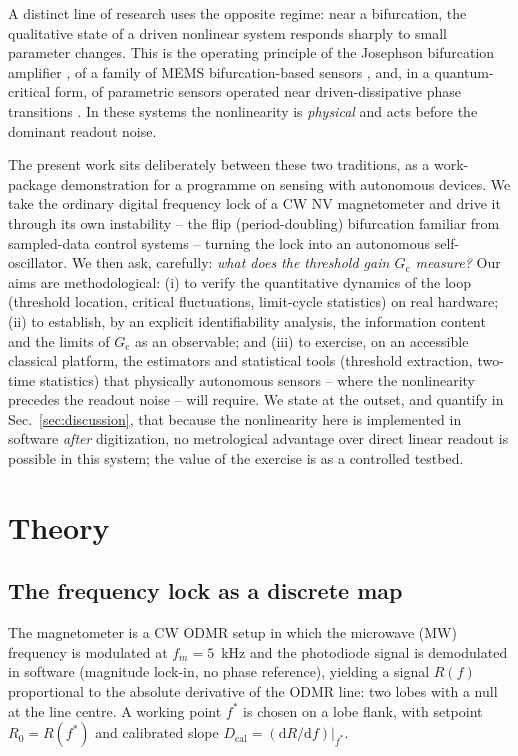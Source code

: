 \documentclass[11pt,a4paper]{article}
\newcommand{\Gc}{G_{\mathrm{c}}}
\newcommand{\Dcal}{D_{\mathrm{cal}}}
\begin{document}
A distinct line of research uses the opposite regime: near a bifurcation, the
qualitative state of a driven nonlinear system responds sharply to small
parameter changes. This is the operating principle of the Josephson
bifurcation amplifier \cite{Siddiqi2004}, of a family of MEMS
bifurcation-based sensors \cite{MEMSunlock2023,MEMSmass2020}, and, in a
quantum-critical form, of parametric sensors operated near driven-dissipative
phase transitions \cite{DiCandia2023,PRXQ2025}. In these systems the
nonlinearity is \emph{physical} and acts before the dominant readout noise.

The present work sits deliberately between these two traditions, as a
work-package demonstration for a programme on sensing with autonomous devices.
We take the ordinary digital frequency lock of a CW NV magnetometer and drive
it through its own instability -- the flip (period-doubling) bifurcation
familiar from sampled-data control systems \cite{Banerjee2001,Strogatz} --
turning the lock into an autonomous self-oscillator. We then ask, carefully:
\emph{what does the threshold gain $\Gc$ measure?} Our aims are
methodological: (i) to verify the quantitative dynamics of the loop
(threshold location, critical fluctuations, limit-cycle statistics) on real
hardware; (ii) to establish, by an explicit identifiability analysis, the
information content and the limits of $\Gc$ as an observable; and (iii) to
exercise, on an accessible classical platform, the estimators and statistical
tools (threshold extraction, two-time statistics) that physically autonomous
sensors -- where the nonlinearity precedes the readout noise -- will require.
We state at the outset, and quantify in Sec.~\ref{sec:discussion}, that
because the nonlinearity here is implemented in software \emph{after}
digitization, no metrological advantage over direct linear readout is possible
in this system; the value of the exercise is as a controlled testbed.

\section{Theory}
\label{sec:theory}

\subsection{The frequency lock as a discrete map}
\label{sec:map}

The magnetometer is a CW ODMR setup in which the microwave (MW) frequency is
modulated at $f_m = 5$~kHz and the photodiode signal is demodulated in
software (magnitude lock-in, no phase reference), yielding a signal $R(f)$
proportional to the absolute derivative of the ODMR line: two lobes with a
null at the line centre. A working point $f^{*}$ is chosen on a lobe flank,
with setpoint $R_0 = R(f^{*})$ and calibrated slope
$\Dcal = (\mathrm{d}R/\mathrm{d}f)|_{f^{*}}$.
\end{document}
